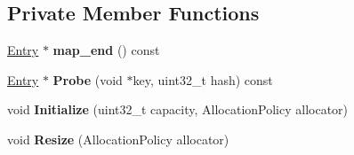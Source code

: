 \subsection*{Private Member Functions}
\begin{DoxyCompactItemize}
\item 
\hyperlink{structv8_1_1internal_1_1_template_hash_map_impl_1_1_entry}{Entry} $\ast$ {\bfseries map\+\_\+end} () const \hypertarget{classv8_1_1internal_1_1_template_hash_map_impl_af45bcf1b80a2a0c715d40e1652a9ccf9}{}\label{classv8_1_1internal_1_1_template_hash_map_impl_af45bcf1b80a2a0c715d40e1652a9ccf9}

\item 
\hyperlink{structv8_1_1internal_1_1_template_hash_map_impl_1_1_entry}{Entry} $\ast$ {\bfseries Probe} (void $\ast$key, uint32\+\_\+t hash) const \hypertarget{classv8_1_1internal_1_1_template_hash_map_impl_a7af103dd0e56891fd24cbbfff54f1023}{}\label{classv8_1_1internal_1_1_template_hash_map_impl_a7af103dd0e56891fd24cbbfff54f1023}

\item 
void {\bfseries Initialize} (uint32\+\_\+t capacity, Allocation\+Policy allocator)\hypertarget{classv8_1_1internal_1_1_template_hash_map_impl_af36bdeeb7fbb7ffdf618ff2ff588027c}{}\label{classv8_1_1internal_1_1_template_hash_map_impl_af36bdeeb7fbb7ffdf618ff2ff588027c}

\item 
void {\bfseries Resize} (Allocation\+Policy allocator)\hypertarget{classv8_1_1internal_1_1_template_hash_map_impl_a2038bdfbd8c55db1dc06f2d9070db19b}{}\label{classv8_1_1internal_1_1_template_hash_map_impl_a2038bdfbd8c55db1dc06f2d9070db19b}

\end{DoxyCompactItemize}
